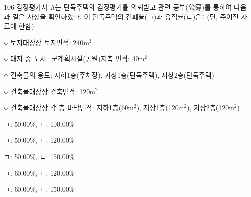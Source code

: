 \begin{question}{106}
감정평가사 A는 단독주택의 감정평가를 의뢰받고 관련 공부(公簿)를 통하여 다음과 같은 사항을 확인하였다. 이 단독주택의 건폐율(ㄱ)과 용적률(ㄴ)은? (단, 주어진 자료에 한함)
\begin{framedtext}
○ 토지대장상 토지면적: 240m$^2$ \par
○ 대지 중 도시·군계획시설(공원)저촉 면적: 40m$^2$ \par
○ 건축물의 용도: 지하1층(주차장), 지상1층(단독주택), 지상2층(단독주택) \par
○ 건축물대장상 건축면적: 120m$^2$ \par
○ 건축물대장상 각 층 바닥면적: 지하1층(60m$^2$), 지상1층(120m$^2$), 지상2층(120m$^2$) \par
\end{framedtext}
\begin{choices}
  \item ㄱ: 50.00\%, ㄴ: 100.00\%
  \item ㄱ: 50.00\%, ㄴ: 120.00\%
  \item ㄱ: 50.00\%, ㄴ: 150.00\%
  \item ㄱ: 60.00\%, ㄴ: 120.00\%
  \item ㄱ: 60.00\%, ㄴ: 150.00\%
\end{choices}
\end{question}
